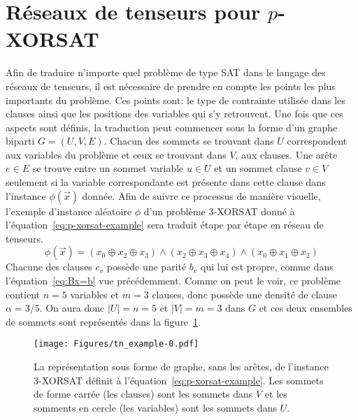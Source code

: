 \section{Réseaux de tenseurs pour \texorpdfstring{$p$}{p}-XORSAT}\label{sec:tn-for-p-xorsat}
Afin de traduire n'importe quel problème de type SAT dans le langage des réseaux de tenseurs, il est nécessaire de prendre en compte les points les plus importants du problème.
Ces points sont: le type de contrainte utilisée dans les clauses ainsi que les positions des variables qui s'y retrouvent.
Une fois que ces aspects sont définis, la traduction peut commencer sous la forme d'un graphe biparti $G = (U, V, E)$.
Chacun des sommets se trouvant dans $U$ correspondent aux variables du problème et ceux se trouvant dans $V$, aux clauses.
Une arête $e \in E$ se trouve entre un sommet variable $u \in U$ et un sommet clause $v \in V$ seulement si la variable correspondante est présente dans cette clause dans l'instance $\phi(\vec{x})$ donnée.
Afin de suivre ce processus de manière visuelle, l'exemple d'instance aléatoire $\phi$ d'un problème $3$-XORSAT donné à l'équation~\ref{eq:p-xorsat-example} sera traduit étape par étape en réseau de tenseurs.
\begin{equation}\label{eq:p-xorsat-example}
    \phi(\vec{x}) = (x_0 \oplus x_2 \oplus x_3) \wedge (x_2 \oplus x_3 \oplus x_4) \wedge (x_0 \oplus x_1 \oplus x_2)
\end{equation}
Chacune des clauses $c_v$ possède une parité $b_v$ qui lui est propre, comme dans l'équation~\ref{eq:Bx=b} vue précédemment.
Comme on peut le voir, ce problème contient $n = 5$ variables et $m = 3$ clauses, donc possède une densité de clause $\alpha = 3/5$.
On aura donc $|U| = n = 5$ et $|V| = m = 3$ dans $G$ et ces deux ensembles de sommets sont représentés dans la figure~\ref{fig:tn-example0}.
\begin{figure}[h]
    \centering
    \texttt{[image: Figures/tn\_example-0.pdf]}
    \caption[La représentation sous forme de graphe, sans les arêtes, de l'instance $3$-XORSAT définit à l'équation~\ref{eq:p-xorsat-example}.]{La représentation sous forme de graphe, sans les arêtes, de l'instance $3$-XORSAT définit à l'équation~\ref{eq:p-xorsat-example}. Les sommets de forme carrée (les clauses) sont les sommets dans $V$ et les somments en cercle (les variables) sont les sommets dans $U$.}
    \label{fig:tn-example0}
\end{figure}
